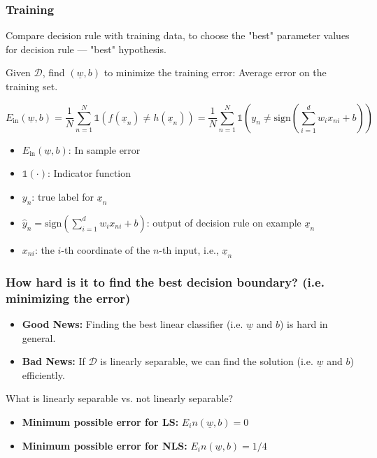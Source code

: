     \subsubsection{Training}
    \begin{definition}
        Compare decision rule with training data, to choose the "best" parameter values for decision rule — "best" hypothesis.
        \vspace{1em}

        Given $\mathcal{D}$, find $(\underline{w}, b)$ to minimize the training error: Average error on the training set.

        $$
        E_{\text{in}}(\underline{w}, b) = \frac{1}{N} \sum_{n=1}^{N} \mathbb{1}(f(\underline{x}_n) \neq h(\underline{x}_n)) = \frac{1}{N} \sum_{n=1}^{N} \mathbb{1}\left( y_n \neq \text{sign}\left( \sum_{i=1}^{d} w_i x_{ni} + b \right) \right)
        $$

        \begin{itemize}
            \item $E_{\text{in}}(\underline{w}, b)$: In sample error
            \item $\mathbb{1}(\cdot)$: Indicator function 
            \item $y_n$: true label for $\underline{x}_n$ 
            \item $\hat{y}_n=\text{sign}\left( \sum_{i=1}^{d} w_i x_{ni} + b \right) $: output of decision rule on example $\underline{x}_n$ 
            \item $x_{ni}$: the $i$-th coordinate of the $n$-th input, i.e., $\underline{x}_n$
        \end{itemize}
    \end{definition}

    \subsubsection{How hard is it to find the best decision boundary? (i.e. minimizing the error)}
    \begin{example}
        
        \begin{itemize}
            \item \textbf{Good News:} Finding the best linear classifier (i.e. $\underline{w}$ and $b$) is hard in general. 
            \item \textbf{Bad News:} If $\mathcal{D}$ is linearly separable, we can find the solution (i.e. $\underline{w}$ and $b$) efficiently.
        \end{itemize}

        What is linearly separable vs. not linearly separable?
        \begin{itemize}
            \item \textbf{Minimum possible error for LS:} $E_in(\underline{w}, b) = 0$
            \item \textbf{Minimum possible error for NLS:} $E_in(\underline{w}, b) = 1/4$
        \end{itemize}
    \end{example}
